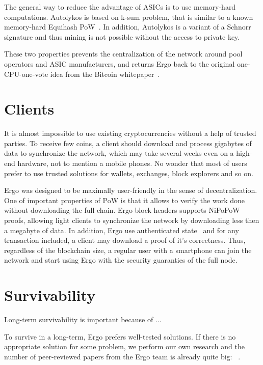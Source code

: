\documentclass[]{article}
\begin{document}
    The general way to reduce the advantage of ASICs is to use memory-hard computations.
    Autolykos is based on k-sum problem, that is similar to a known memory-hard Equihash PoW~\cite{biryukov2017equihash}.
    In addition, Autolykos is a variant of a Schnorr signature and thus mining is not possible without the access to private key.

    These two properties prevents the centralization of the
    network around pool operators and ASIC manufacturers, and returns Ergo back to the original
    one-CPU-one-vote idea from the Bitcoin whitepaper~\cite{nakamoto2008bitcoin}.

    \section{Clients}

    It is almost impossible to use existing cryptocurrencies without a help of trusted parties.
    To receive few coins, a client should download and process gigabytes of
    data to synchronize the network, which may take several weeks even on a high-end hardware,
    not to mention a mobile phones.
    No wonder that most of users prefer to use trusted solutions for wallets, exchanges, block
    explorers and so on.

    Ergo was designed to be maximally user-friendly in the sense of decentralization.
    One of important properties of PoW is that it allows to verify the work done without
    downloading the full chain.
    Ergo block headers supports NiPoPoW~\cite{kiayias2017non} proofs, allowing light clients
    to synchronize the network by downloading less then a megabyte of data.
    In addition, Ergo use authenticated state~\cite{reyzin2017improving} and for any transaction
    included, a client may download a proof of it's correctness.
    Thus, regardless of the blockchain size, a regular user with a smartphone can
    join the network and start using Ergo with the security guaranties of the full node.

    \section{Survivability}

    Long-term survivability is important because of ...

    To survive in a long-term, Ergo prefers well-tested solutions.
    If there is no appropriate solution for some problem, we perform our own research and
    the number of peer-reviewed papers from the Ergo team is already quite big:
    ~\cite{reyzin2017improving,meshkov2017short,chepurnoy2018systematic,chepurnoy2018self,chepurnoy2018checking,duong2018multi}.
\end{document}
